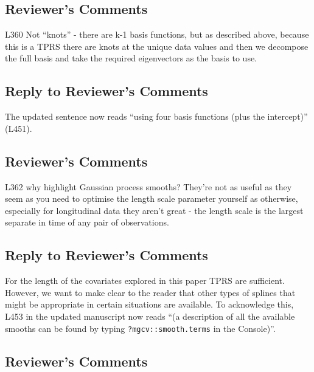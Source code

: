 \documentclass[
]{article}
\newcommand{\passthrough}[1]{#1}
\begin{document}
\hypertarget{reviewers-comments-28}{%
\subsection{Reviewer's Comments}\label{reviewers-comments-28}}

L360 Not ``knots'' - there are k-1 basis functions, but as described above, because this is a TPRS there are knots at the unique data values and then we decompose the full basis and take the required eigenvectors as the basis to use.

\hypertarget{section-29}{%
\subsection{\texorpdfstring{\textcolor{reviewersblue} {Reply to Reviewer's Comments}}{}}\label{section-29}}

The updated sentence now reads ``using four basis functions (plus the intercept)'' (L451).

\hypertarget{reviewers-comments-29}{%
\subsection{Reviewer's Comments}\label{reviewers-comments-29}}

L362 why highlight Gaussian process smooths? They're not as useful as they seem as you need to optimise the length scale parameter yourself as otherwise, especially for longitudinal data they aren't great - the length scale is the largest separate in time of any pair of observations.

\hypertarget{section-30}{%
\subsection{\texorpdfstring{\textcolor{reviewersblue} {Reply to Reviewer's Comments}}{}}\label{section-30}}

For the length of the covariates explored in this paper TPRS are sufficient. However, we want to make clear to the reader that other types of splines that might be appropriate in certain situations are available. To acknowledge this, L453 in the updated manuscript now reads ``(a description of all the available smooths can be found by typing \passthrough{\lstinline!?mgcv::smooth.terms!} in the Console)''.

\hypertarget{reviewers-comments-30}{%
\subsection{Reviewer's Comments}\label{reviewers-comments-30}}
\end{document}
